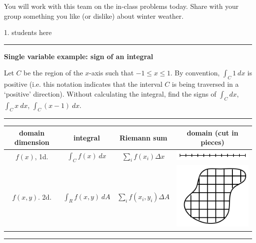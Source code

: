 \documentclass[12pt,letterpaper,noanswers]{exam}
\begin{document}
You will work with this team on the in-class problems today.  Share with your group something you like (or dislike) about winter weather.
\begin{multicols}{2}
1.  students here


\end{multicols}

\hrule
\vspace{0.2cm}
\noindent\textbf{Single variable example: sign of an integral}

Let $C$ be the region of the $x$-axis such that $-1\leq x \leq 1$.  By convention, $\int_C 1\ dx$ is positive (i.e. this notation indicates that the interval $C$ is being traversed in a `positive' direction).  Without calculating the integral, find the signs of
   $\displaystyle\int_C dx$,
    $\displaystyle\int_C x\ dx$,
   $\displaystyle\int_C (x-1)\ dx$. %
   
   \vspace{1.5in}

\vspace{0.2cm}
\hrule
\vspace{0.2cm}

\begin{tabular}{|c|c|c|c|}
\hline
domain dimension & integral & Riemann sum & domain (cut in pieces)  \\
\hline
$f(x)$, 1d. & $\displaystyle\int_C f(x)\ dx$ & $\displaystyle\sum\limits_{i}f(x_{i})\Delta x$ & \includegraphics[scale=0.7]{img/C11line.png}    \\
\hline
$f(x,y)$.  2d. & $\displaystyle\int_R f(x,y)\ dA$ & $\displaystyle\sum\limits_{i}f(x_{i},y_i)\Delta A$ &  \includegraphics[scale=0.7]{img/C11region.png}   \\
\hline
\end{tabular}

\vspace{0.2cm}
\hrule
\vspace{0.2cm}
\end{document}
